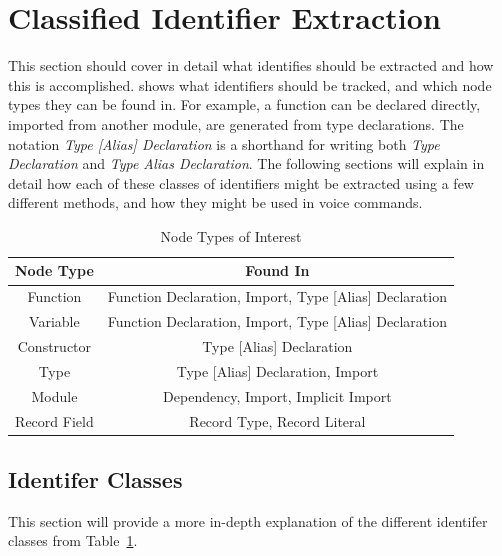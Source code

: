 \documentclass[../thesis.tex]{subfiles}
\begin{document}
\section{Classified Identifier Extraction}%
\label{sec:classified_identifier_extraction}
This section should cover in detail what identifies should be extracted
and how this is accomplished.  shows
what identifiers should be tracked, and which node types they can be found in.
For example, a function can be declared directly, imported from another module, are generated
from type declarations. The notation \textit{Type [Alias] Declaration} is a shorthand
for writing both \textit{Type Declaration} and \textit{Type Alias Declaration}.
The following sections will explain in detail how each of these classes of identifiers
might be extracted using a few different methods, and how they might be used in voice commands.

\begin{table}[htpb]
    \begin{tabular}{|c|c|}
        \hline
        Node Type & Found In \\
        \hline
        Function & Function Declaration, Import, Type [Alias] Declaration \\
        Variable & Function Declaration, Import, Type [Alias] Declaration \\
        Constructor & Type [Alias] Declaration \\
        Type & Type [Alias] Declaration, Import \\
        Module & Dependency, Import, Implicit Import \\
        Record Field & Record Type, Record Literal \\
        \hline
    \end{tabular}
    \caption{Node Types of Interest}
    \label{tab:constructs_of_interest}
\end{table}

\subsection{Identifer Classes}%
\label{sub:identifer_classes}
This section will provide a more in-depth explanation of the different identifer classes from Table~\ref{tab:constructs_of_interest}. 
\end{document}
